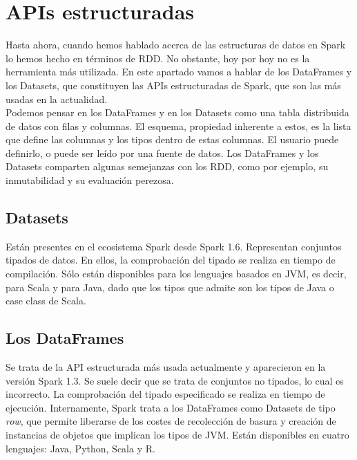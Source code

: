 \section{APIs estructuradas}

Hasta ahora, cuando hemos hablado acerca de las estructuras de datos en Spark lo hemos hecho en términos de RDD. No obstante, hoy por hoy no es la herramienta más utilizada. En este apartado vamos a hablar de los DataFrames y los Datasets, que constituyen las APIs estructuradas de Spark, que son las más usadas en la actualidad.\\

Podemos pensar en los DataFrames y en los Datasets como una tabla distribuida de datos con filas y columnas. El esquema, propiedad inherente a estos, es la lista que define las columnas y los tipos dentro de estas columnas. El usuario puede definirlo, o puede ser leído  por una fuente de datos. Los DataFrames y los Datasets comparten algunas semejanzas con los RDD, como por ejemplo, su inmutabilidad y su evaluación perezosa.\\

\subsection{Datasets}

Están presentes en el ecosistema Spark desde Spark 1.6. Representan conjuntos tipados de datos. En ellos, la comprobación del tipado se realiza en tiempo de compilación. Sólo están disponibles para los lenguajes basados en JVM, es decir, para Scala y para Java, dado que los tipos que admite son los tipos de Java o case class de Scala.\\

\subsection{Los DataFrames} 

Se trata de la API estructurada más usada actualmente y aparecieron en la versión Spark 1.3. Se suele decir que se trata de conjuntos no tipados, lo cual es incorrecto. La comprobación del tipado especificado se realiza en tiempo de ejecución. Internamente, Spark trata a los DataFrames como Datasets de tipo \textit{row}, que permite liberarse de los costes de recolección de basura y creación de instancias de objetos que implican los tipos de JVM. Están disponibles en cuatro lenguajes: Java, Python, Scala y R. 


